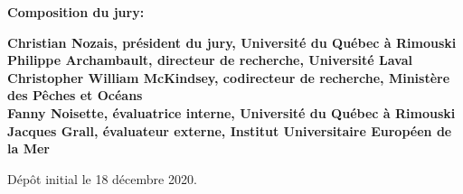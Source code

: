 \thispagestyle{empty}

\null
\vfill
\noindent \textbf{Composition du jury:}\\
\vspace{1cm}

\begin{singlespace}
  \noindent \textbf{Christian Nozais, président du jury, Université du Québec à Rimouski}\\

  \noindent \textbf{Philippe Archambault, directeur de recherche, Université Laval}\\

  \noindent \textbf{Christopher William McKindsey, codirecteur de recherche, Ministère des Pêches et Océans}\\

  \noindent \textbf{Fanny Noisette, évaluatrice interne, Université du Québec à Rimouski}\\

  \noindent \textbf{Jacques Grall, évaluateur externe, Institut Universitaire Européen de la Mer}\\
\end{singlespace}

\vspace{2cm}
\noindent Dépôt initial le 18 décembre 2020.
\hspace{3cm}


\cleardoublepage
